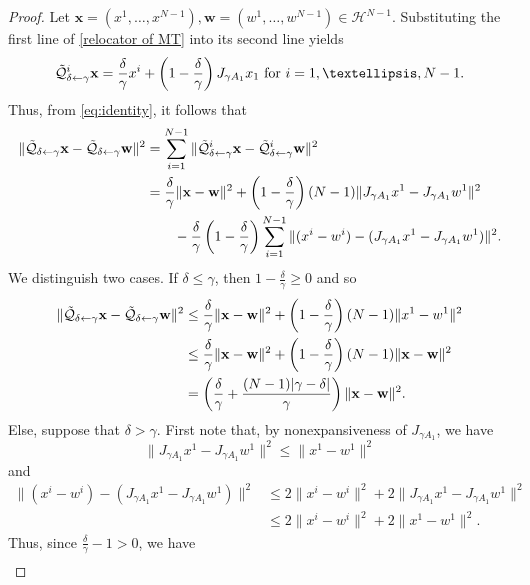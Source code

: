 \documentclass[10pt,a4paper]{amsart}
\begin{document}
\begin{proof}
    Let $\mathbf{x}=(x^1,\dots,x^{N-1}), \mathbf{w}=(w^1,\dots,w^{N-1}) \in \mathcal{H}^{N-1}$. Substituting the first line of \eqref{relocator of MT} into its second line yields 
\begin{equation*}\mathcal{\Tilde{Q}}^i_{\delta\leftarrow\gamma} \mathbf{x}=\frac{\delta}{\gamma}x^i+ \left( 1 - \frac{\delta}{\gamma} \right) J_{\gamma A_1}x_1 \text{~for~}i=1,\dots,N-1.
\end{equation*}
Thus, from \eqref{eq:identity}, it follows that
\begin{align*}    \|\mathcal{\Tilde{Q}}_{\delta\gets\gamma}\mathbf{x}-\mathcal{\Tilde{Q}}_{\delta\gets\gamma}\mathbf{w}\|^2
    &= \sum_{i=1}^{N-1} \|\mathcal{\Tilde{Q}}_{\delta\gets\gamma}^i\mathbf{x}-\mathcal{\Tilde{Q}}_{\delta\gets\gamma}^i\mathbf{w}\|^2 \\ & =
    \frac{\delta}{\gamma}\|\mathbf{x}-\mathbf{w}\|^2+\left( 1 - \frac{\delta}{\gamma} \right)(N-1)\|J_{\gamma A_1}x^1-J_{\gamma A_1}w^1\|^2 \\
    &\qquad - \frac{\delta}{\gamma}\left( 1 - \frac{\delta}{\gamma} \right)\sum_{i=1}^{N-1}\|(x^i-w^i)-(J_{\gamma A_1}x^1-J_{\gamma A_1}w^1)\|^2.
\end{align*} 
We distinguish two cases. If $\delta\leq\gamma$, then $1-\frac{\delta}{\gamma}\geq 0$ and so
\begin{align*}
    \|\mathcal{\Tilde{Q}}_{\delta\gets\gamma}\mathbf{x}-\mathcal{\Tilde{Q}}_{\delta\gets\gamma}\mathbf{w}\|^2
    &\leq \frac{\delta}{\gamma}\|\mathbf{x}-\mathbf{w}\|^2+\left( 1 - \frac{\delta}{\gamma} \right)(N-1)\|x^1-w^1\|^2\\
    &\leq \frac{\delta}{\gamma}\|\mathbf{x}-\mathbf{w}\|^2+\left( 1 - \frac{\delta}{\gamma} \right)(N-1)\|\mathbf{x}-\mathbf{w}\|^2\\
    &= \left(\frac{\delta}{\gamma}+\frac{(N-1)|\gamma-\delta|}{\gamma} \right)\|\mathbf{x}-\mathbf{w}\|^2.
\end{align*}
Else, suppose that $\delta>\gamma$. First note that, by nonexpansiveness of $J_{\gamma A_1}$, we have
$$ \|J_{\gamma A_1}x^1-J_{\gamma A_1}w^1\|^2 \leq \|x^1-w^1\|^2$$
and
\begin{align*}
    \|(x^i-w^i)-(J_{\gamma A_1}x^1-J_{\gamma A_1}w^1)\|^2
    & \leq 2\|x^i-w^i \| ^2 + 2\|J_{\gamma A_1}x^1-J_{\gamma A_1}w^1\|^2 \\
    &\leq 2\|x^i-w^i\|^2 + 2\|x^1-w^1\|^2.
\end{align*}
Thus, since $\frac{\delta}{\gamma}-1>0$, we have
\begin{align*}

\end{align*}
\end{proof}
\end{document}
